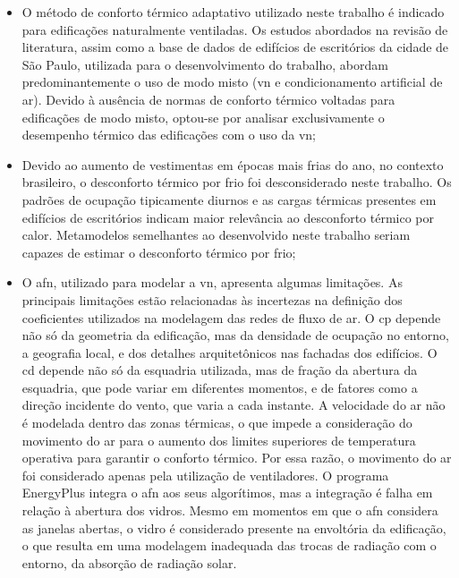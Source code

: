 \documentclass[brazil,hardcopy,openany]{ufscthesis} %
\begin{document}
\begin{itemize}
	
	\item O método de conforto térmico adaptativo utilizado neste trabalho é indicado para edificações naturalmente ventiladas. Os estudos abordados na revisão de literatura, assim como a base de dados de edifícios de escritórios da cidade de São Paulo, utilizada para o desenvolvimento do trabalho, abordam predominantemente o uso de modo misto (\acrshort{vn} e condicionamento artificial de ar). Devido à ausência de normas de conforto térmico voltadas para edificações de modo misto, optou-se por analisar exclusivamente o desempenho térmico das edificações com o uso da \acrshort{vn};
	
	\item Devido ao aumento de vestimentas em épocas mais frias do ano, no contexto brasileiro, o desconforto térmico por frio foi desconsiderado neste trabalho. Os padrões de ocupação tipicamente diurnos e as cargas térmicas presentes em edifícios de escritórios indicam maior relevância ao desconforto térmico por calor. Metamodelos semelhantes ao desenvolvido neste trabalho seriam capazes de estimar o desconforto térmico por frio;
	
	\item O \acrlong{afn}, utilizado para modelar a \acrshort{vn}, apresenta algumas limitações. 
	As principais limitações estão relacionadas às incertezas na definição dos coeficientes utilizados na modelagem das redes de fluxo de ar. 
	O \acrshort{cp} depende não só da geometria da edificação, mas da densidade de ocupação no entorno, a geografia local, e dos detalhes arquitetônicos nas fachadas dos edifícios.
	O \acrfull{cd} depende não só da esquadria utilizada, mas de fração da abertura da esquadria, que pode variar em diferentes momentos, e de fatores como a direção incidente do vento, que varia a cada instante.
	A velocidade do ar não é modelada dentro das zonas térmicas, o que impede a consideração do movimento do ar para o aumento dos limites superiores de temperatura operativa para garantir o conforto térmico. 
	Por essa razão, o movimento do ar foi considerado apenas pela utilização de ventiladores.
	O programa EnergyPlus integra o \acrshort{afn} aos seus algorítimos, mas a integração é falha em relação à abertura dos vidros. Mesmo em momentos em que o \acrshort{afn} considera as janelas abertas, o vidro é considerado presente na envoltória da edificação, o que resulta em uma modelagem inadequada das trocas de radiação com o entorno, da absorção de radiação solar.
	
\end{itemize}
\end{document}
